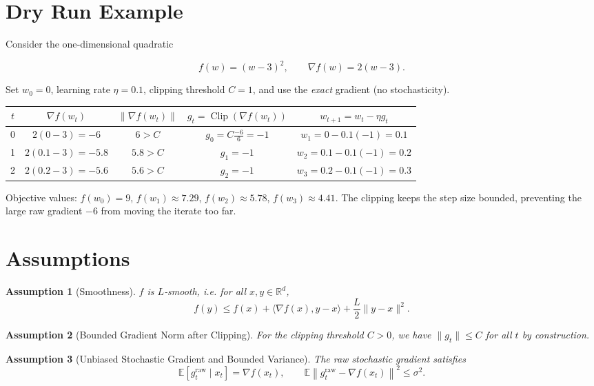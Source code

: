 \documentclass{article}
\newtheorem{assumption}{Assumption}
\newcommand{\E}{\mathbb{E}}
\newcommand{\R}{\mathbb{R}}
\begin{document}
\section*{Dry Run Example}
Consider the one‑dimensional quadratic  

\[
f(w)=(w-3)^{2},\qquad \nabla f(w)=2(w-3).
\]

Set $w_{0}=0$, learning rate $\eta=0.1$, clipping threshold $C=1$, and use the \emph{exact} gradient (no stochasticity).  

\begin{center}
\begin{tabular}{c|c|c|c|c}
$t$ & $\nabla f(w_{t})$ & $\| \nabla f(w_{t})\|$ & $g_{t}=\operatorname{Clip}(\nabla f(w_{t}))$ & $w_{t+1}=w_{t}-\eta g_{t}$ \\ \hline
0 & $2(0-3)=-6$ & $6>C$ & $g_{0}=C\frac{-6}{6}=-1$ & $w_{1}=0-0.1(-1)=0.1$ \\[4pt]
1 & $2(0.1-3)=-5.8$ & $5.8>C$ & $g_{1}= -1$ & $w_{2}=0.1-0.1(-1)=0.2$ \\[4pt]
2 & $2(0.2-3)=-5.6$ & $5.6>C$ & $g_{2}= -1$ & $w_{3}=0.2-0.1(-1)=0.3$ 
\end{tabular}
\end{center}

Objective values: $f(w_{0})=9$, $f(w_{1})\approx7.29$, $f(w_{2})\approx5.78$, $f(w_{3})\approx4.41$.  
The clipping keeps the step size bounded, preventing the large raw gradient $-6$ from moving the iterate too far.

\newpage

\section*{Assumptions}
\begin{assumption}[Smoothness]\label{ass:smooth}
$f$ is $L$‑smooth, i.e. for all $x,y\in\R^{d}$,
\[
f(y)\le f(x)+\langle\nabla f(x),y-x\rangle+\frac{L}{2}\|y-x\|^{2}.
\]
\end{assumption}

\begin{assumption}[Bounded Gradient Norm after Clipping]\label{ass:clip}
For the clipping threshold $C>0$, we have $\|g_{t}\|\le C$ for all $t$ by construction.
\end{assumption}

\begin{assumption}[Unbiased Stochastic Gradient and Bounded Variance]\label{ass:unbias}
The raw stochastic gradient satisfies  
\[
\E\!\left[g^{\text{raw}}_{t}\mid x_{t}\right]=\nabla f(x_{t}),\qquad 
\E\!\left\|g^{\text{raw}}_{t}-\nabla f(x_{t})\right\|^{2}\le\sigma^{2}.
\]
\end{assumption}
\end{document}
